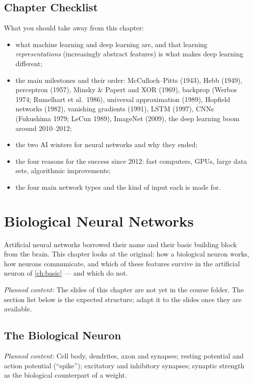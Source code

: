 \documentclass[11pt, oneside]{book}
\newcommand{\planned}[1]{%
  \par{\small\color{gray!70!black}\textit{Planned content:} #1}\par}
\let\originalsection\section
\renewcommand{\section}{\Needspace{7\baselineskip}\originalsection}
\begin{document}
\section{Chapter Checklist}

What you should take away from this chapter:
\begin{itemize}
  \item what machine learning and deep learning are, and that learning
    \emph{representations} (increasingly abstract features) is what makes
    deep learning different;
  \item the main milestones and their order: McCulloch--Pitts (1943), Hebb
    (1949), perceptron (1957), Minsky \& Papert and XOR (1969), backprop
    (Werbos 1974; Rumelhart et al.\ 1986), universal approximation (1989),
    Hopfield networks (1982), vanishing gradients (1991), LSTM (1997), CNNs
    (Fukushima 1979; LeCun 1989), ImageNet (2009), the deep learning boom
    around 2010--2012;
  \item the two AI winters for neural networks and why they ended;
  \item the four reasons for the success since 2012: fast computers, GPUs,
    large data sets, algorithmic improvements;
  \item the four main network types and the kind of input each is made for.
\end{itemize}

\chapter{Biological Neural Networks}
\label{ch:bio}

Artificial neural networks borrowed their name and their basic building
block from the brain. This chapter looks at the original: how a biological
neuron works, how neurons communicate, and which of these features survive
in the artificial neuron of \cref{ch:basic} --- and which do not.

\planned{The slides of this chapter are not yet in the course folder. The
section list below is the expected structure; adapt it to the slides once
they are available.}

\section{The Biological Neuron}
\planned{Cell body, dendrites, axon and synapses; resting potential and
action potential (``spike''); excitatory and inhibitory synapses; synaptic
strength as the biological counterpart of a weight.}
\end{document}
